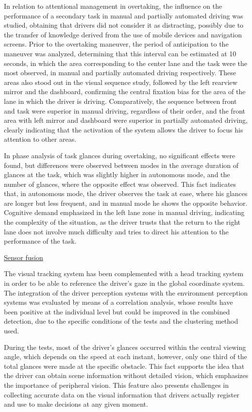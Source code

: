 In relation to attentional management in overtaking, the influence on the performance of a secondary task in manual and partially automated driving was studied, obtaining that drivers did not consider it as distracting, possibly due to the transfer of knowledge derived from the use of mobile devices and navigation screens. Prior to the overtaking maneuver, the period of anticipation to the maneuver was analyzed, determining that this interval can be estimated at 10 seconds, in which the area corresponding to the center lane and the task were the most observed, in manual and partially automated driving respectively. These areas also stood out in the visual sequence study, followed by the left rearview mirror and the dashboard, confirming the central fixation bias for the area of the lane in which the driver is driving. Comparatively, the sequence between front and task were superior in manual driving, regardless of their order, and the front area with left mirror and dashboard were superior in partially automated driving, clearly indicating that the activation of the system allows the driver to focus his attention to other areas.   

In phase analysis of task glances during overtaking, no significant effects were found, but differences were observed between modes in the average duration of glances at the task, which was slightly higher in autonomous mode, and the number of glances, where the opposite effect was observed. This fact indicates that, in autonomous mode, the driver observes the task at ease, where his glances are longer but less frequent, and in manual mode he shows the opposite behavior. Cognitive demand emphasized in the left lane zone in manual driving, indicating the complexity of the situation, as the driver trusts that the return to the right lane does not involve much difficulty and tries to direct his attention to the performance of the task. 

\underline{Sensor fusion }

The visual tracking system has been complemented with a head tracking system in order to be able to reference the driver's gaze in the global coordinate system. The integration of the driver perception systems with the environment perception systems was evaluated by means of a correlation analysis, whose results have been positive at the individual level but could be improved in the combined detection, due to the specific conditions of the tests and the clustering method used.  

During the tests, most of the driver's glances occurred within the central viewing angle, which depends on the speed at each instant, however, only one third of the total glances were made at the specific obstacle. This fact supports the idea that the driver can obtain scene information without detailed vision, which emphasizes the importance of peripheral vision. This feature also presents challenges in collecting accurate data on the visual information that drivers actually register and use to make decisions at any given moment. 

